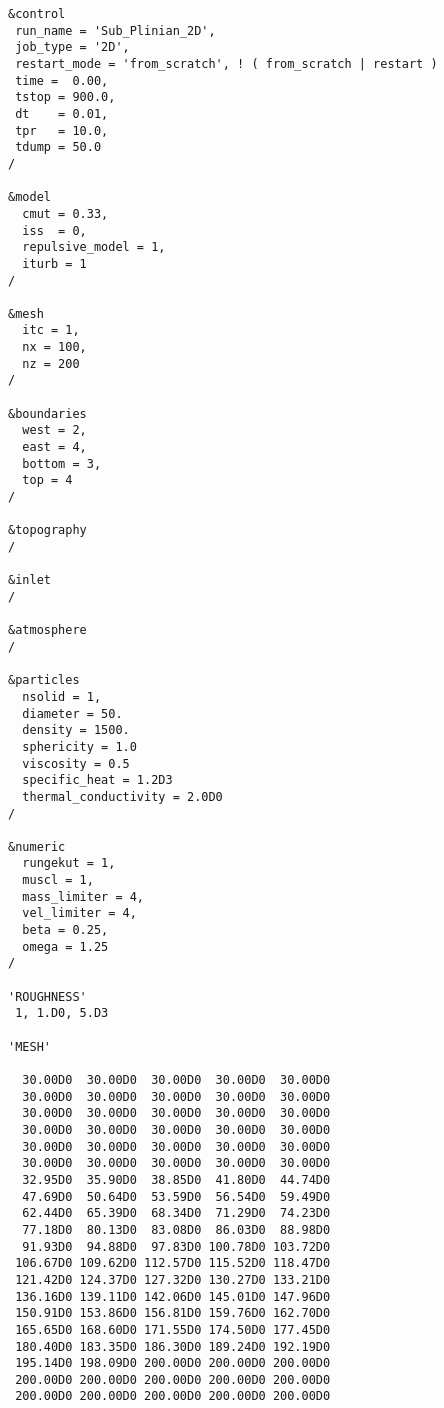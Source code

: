 \begin{verbatim}
&control
 run_name = 'Sub_Plinian_2D',
 job_type = '2D',
 restart_mode = 'from_scratch', ! ( from_scratch | restart )
 time =  0.00,
 tstop = 900.0,
 dt    = 0.01,
 tpr   = 10.0,
 tdump = 50.0
/

&model
  cmut = 0.33,
  iss  = 0,
  repulsive_model = 1,
  iturb = 1
/

&mesh
  itc = 1, 
  nx = 100,
  nz = 200
/

&boundaries
  west = 2,
  east = 4,
  bottom = 3,
  top = 4
/

&topography
/

&inlet
/

&atmosphere
/

&particles
  nsolid = 1, 
  diameter = 50.
  density = 1500.
  sphericity = 1.0
  viscosity = 0.5
  specific_heat = 1.2D3
  thermal_conductivity = 2.0D0
/

&numeric
  rungekut = 1,
  muscl = 1,
  mass_limiter = 4,
  vel_limiter = 4,
  beta = 0.25,
  omega = 1.25
/

'ROUGHNESS'
 1, 1.D0, 5.D3

'MESH'

  30.00D0  30.00D0  30.00D0  30.00D0  30.00D0
  30.00D0  30.00D0  30.00D0  30.00D0  30.00D0
  30.00D0  30.00D0  30.00D0  30.00D0  30.00D0
  30.00D0  30.00D0  30.00D0  30.00D0  30.00D0
  30.00D0  30.00D0  30.00D0  30.00D0  30.00D0
  30.00D0  30.00D0  30.00D0  30.00D0  30.00D0
  32.95D0  35.90D0  38.85D0  41.80D0  44.74D0
  47.69D0  50.64D0  53.59D0  56.54D0  59.49D0
  62.44D0  65.39D0  68.34D0  71.29D0  74.23D0
  77.18D0  80.13D0  83.08D0  86.03D0  88.98D0
  91.93D0  94.88D0  97.83D0 100.78D0 103.72D0
 106.67D0 109.62D0 112.57D0 115.52D0 118.47D0
 121.42D0 124.37D0 127.32D0 130.27D0 133.21D0
 136.16D0 139.11D0 142.06D0 145.01D0 147.96D0
 150.91D0 153.86D0 156.81D0 159.76D0 162.70D0
 165.65D0 168.60D0 171.55D0 174.50D0 177.45D0
 180.40D0 183.35D0 186.30D0 189.24D0 192.19D0
 195.14D0 198.09D0 200.00D0 200.00D0 200.00D0
 200.00D0 200.00D0 200.00D0 200.00D0 200.00D0
 200.00D0 200.00D0 200.00D0 200.00D0 200.00D0


\end{verbatim}

